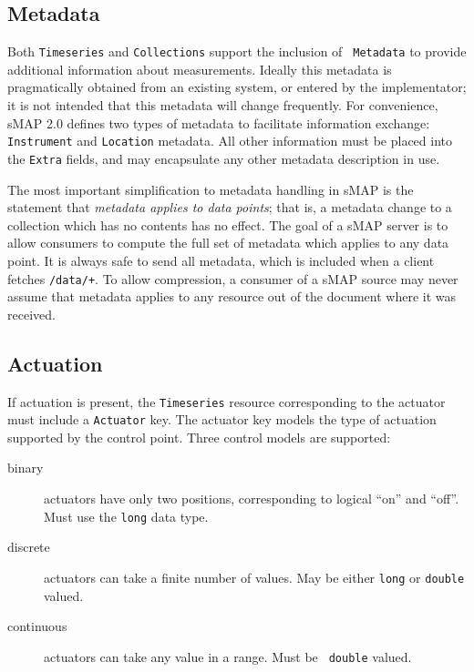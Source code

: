 \documentclass[10pt,letterpaper]{article}
\newcommand{\smap}{sMAP}
\newcommand{\smapversion}{2.0}
\begin{document}
\subsection{Metadata}
Both {\tt Timeseries} and {\tt Collections} support the inclusion of {\tt
  Metadata} to provide additional information about measurements.  Ideally
this metadata is pragmatically obtained from an existing system, or entered by
the implementator; it is not intended that this metadata will change
frequently.  For convenience, \smap{} \smapversion{} defines two types of metadata to
facilitate information exchange: {\tt Instrument} and {\tt Location}
metadata.  All other information must be placed into the {\tt Extra} fields,
and may encapsulate any other metadata description in use.



The most important simplification to metadata handling in \smap{} is the
statement that {\it metadata applies to data points}; that is, a metadata
change to a collection which has no contents has no effect.  The goal of a
\smap{} server is to allow consumers to compute the full set of metadata which
applies to any data point.  It is always safe to send all metadata, which is
included when a client fetches {\tt /data/+}.  To allow compression, a
consumer of a \smap{} source may never assume that metadata applies to any
resource out of the document where it was received.

\subsection{Actuation}

If actuation is present, the {\tt Timeseries} resource corresponding to the
actuator must include a {\tt Actuator} key.  The actuator key models the type
of actuation supported by the control point.  Three control models are
supported:

\begin{description}
\item[binary] actuators have only two positions, corresponding to logical
  ``on'' and ``off''.  Must use the {\tt long} data type.
\item[discrete] actuators can take a finite number of values.  May be either
  {\tt long} or {\tt double} valued.
\item[continuous] actuators can take any value in a range.  Must be {\tt
    double} valued.
\end{description}
\end{document}
